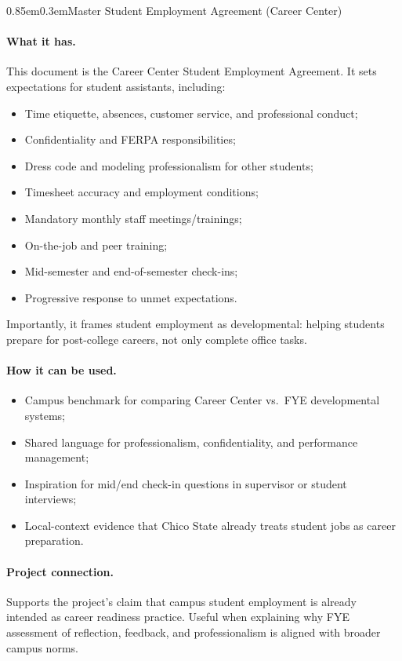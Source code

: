 \documentclass[11pt,letterpaper]{article}
\makeatletter
\renewcommand\subsection{\@startsection{subsection}{2}{\z@}%
  {0.85em}{0.3em}{\normalsize\bfseries}}
\makeatother
\begin{document}
\subsection{Master Student Employment Agreement (Career Center)}
\paragraph{What it has.}
This document is the Career Center Student Employment Agreement. It sets expectations for student assistants, including:
\begin{itemize}
  \item Time etiquette, absences, customer service, and professional conduct;
  \item Confidentiality and FERPA responsibilities;
  \item Dress code and modeling professionalism for other students;
  \item Timesheet accuracy and employment conditions;
  \item Mandatory monthly staff meetings/trainings;
  \item On-the-job and peer training;
  \item Mid-semester and end-of-semester check-ins;
  \item Progressive response to unmet expectations.
\end{itemize}
Importantly, it frames student employment as developmental: helping students prepare for post-college careers, not only complete office tasks.

\paragraph{How it can be used.}
\begin{itemize}
  \item Campus benchmark for comparing Career Center vs.\ FYE developmental systems;
  \item Shared language for professionalism, confidentiality, and performance management;
  \item Inspiration for mid/end check-in questions in supervisor or student interviews;
  \item Local-context evidence that Chico State already treats student jobs as career preparation.
\end{itemize}

\paragraph{Project connection.}
Supports the project's claim that campus student employment is already intended as career readiness practice. Useful when explaining why FYE assessment of reflection, feedback, and professionalism is aligned with broader campus norms.
\end{document}
